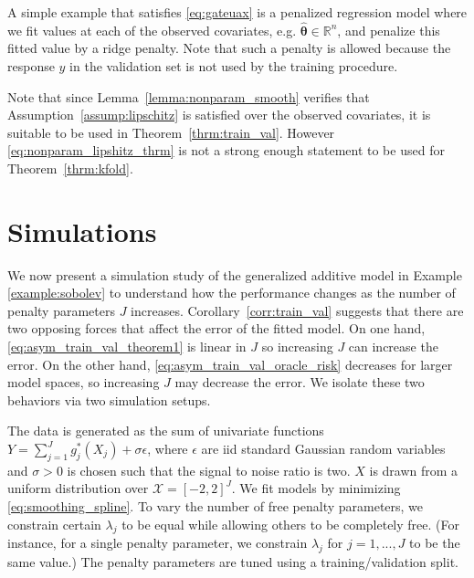 \documentclass[12pt]{article} %
\theoremstyle{definition}
\begin{document}
\noindent
A simple example that satisfies \eqref{eq:gateuax} is a penalized regression model where we fit values at each of the observed covariates, e.g. $\hat{\boldsymbol{\theta}} \in \mathbb{R}^n$, and penalize this fitted value by a ridge penalty.
Note that such a penalty is allowed because the response $y$ in the validation set is not used by the training procedure.

Note that since Lemma~\ref{lemma:nonparam_smooth} verifies that Assumption~\ref{assump:lipschitz} is satisfied over the observed covariates, it is suitable to be used in Theorem~\ref{thrm:train_val}.
However \eqref{eq:nonparam_lipshitz_thrm} is not a strong enough statement to be used for Theorem~\ref{thrm:kfold}.
%

\section{Simulations}\label{sec:simulations}

We now present a simulation study of the generalized additive model in Example \ref{example:sobolev} to understand how the performance changes as the number of penalty parameters $J$ increases.
Corollary~\ref{corr:train_val} suggests that there are two opposing forces that affect the error of the fitted model.
On one hand, \eqref{eq:asym_train_val_theorem1} is linear in $J$ so increasing $J$ can increase the error.
On the other hand, \eqref{eq:asym_train_val_oracle_risk} decreases for larger model spaces, so increasing $J$ may decrease the error.
We isolate these two behaviors via two simulation setups.

The data is generated as the sum of univariate functions
$Y = \sum_{j=1}^J g_j^*(X_j) + \sigma \epsilon$,
where $\epsilon$ are iid standard Gaussian random variables and $\sigma > 0$ is chosen such that the signal to noise ratio is two. $X$ is drawn from a uniform distribution over $\mathcal{X} = [-2, 2]^J$.
We fit models by minimizing \eqref{eq:smoothing_spline}.
To vary the number of free penalty parameters, we constrain certain $\lambda_j$ to be equal while allowing others to be completely free.
(For instance, for a single penalty parameter, we constrain $\lambda_j$ for $j=1,...,J$ to be the same value.) 
The penalty parameters are tuned using a training/validation split.
\end{document}
